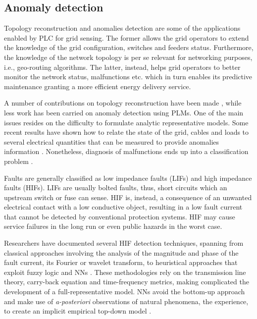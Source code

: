 \subsection{Anomaly detection}
\label{subsec:plc_anomaly_detection}
Topology reconstruction \cite{lampe2013tomography,7797477} and anomalies detection \cite{8641473,7897106} are some of the applications enabled by PLC for grid sensing. The former allows the grid operators to extend the knowledge of the grid configuration, switches and feeders status. Furthermore, the knowledge of the network topology is per se relevant for networking purposes, i.e., geo-routing algorithms. The latter, instead, helps grid operators to better monitor the network status, malfunctions etc. which in turn enables its predictive maintenance granting a more efficient energy delivery service.

A number of contributions on topology reconstruction have been made \cite{6525848,6507589}, while less work has been carried on anomaly detection using PLMs. One of the main issues resides on the difficulty to formulate analytic representative models. Some recent results have shown how to relate the state of the grid, cables and loads to several electrical quantities that can be measured to provide anomalies information \cite{8653266}.
Nonetheless, diagnosis of malfunctions ends up into a classification problem \cite{8641473}. 

Faults are generally classified as low impedance faults (LIFs) and high impedance faults (HIFs). LIFs are usually bolted faults, thus, short circuits which an upstream switch or fuse can sense. HIF is, instead, a consequence of an unwanted electrical contact with a low conductive object, resulting in a low fault current that cannot be detected by conventional protection systems. HIF may cause service failures in the long run or even public hazards in the worst case. 

Researchers have documented several HIF detection techniques, spanning from classical approaches involving the analysis of the magnitude and phase of the fault current, its Fourier or wavelet transform, to heuristical approaches that exploit fuzzy logic and NNs \cite{HIF_review}.
These methodologies rely on the transmission line theory, carry-back equation and time-frequency metrics, making complicated the development of a full-representative model. NNs avoid the bottom-up approach and make use of \textit{a-posteriori} observations of natural phenomena, the experience, to create an implicit empirical top-down model \cite{ML_PLC}. 

